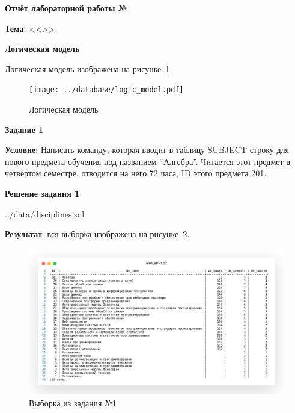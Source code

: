 \begin{center}
  \textbf{Отчёт лабораторной работы №\envReportLabNumber}
\end{center}

\textbf{Тема}:
<<\envReportTitle>>

\begin{center}
  \textbf{Логическая модель}
\end{center}

Логическая модель изображена на рисунке~\ref{fig:logic_model}.

\begin{figure}[!h]
  \centering

  \texttt{[image: ../database/logic\_model.pdf]}

  \caption{Логическая модель}

  \label{fig:logic_model}
\end{figure}

\newpage

\begin{center}
  \textbf{Задание 1}
\end{center}

\textbf{Условие}:
Написать команду, которая вводит в таблицу SUBJECT строку для нового предмета обучения под названием “Алгебра”.
Читается этот предмет в четвертом семестре, отводится на него 72 часа,
ID этого предмета 201.

\begin{center}
  \textbf{Решение задания 1}
\end{center}


{../data/disciplines.sql}



\textbf{Результат}: вся выборка изображена на рисунке~\ref{fig:t1}.

\begin{figure}[!h]
  \centering

  \includegraphics[width=18cm]
  {../sql/task1/1.png}

  \caption{Выборка из задания №1}

  \label{fig:t1}
\end{figure}

